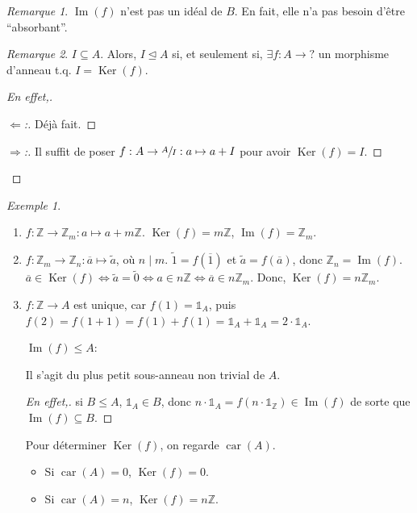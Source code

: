 \documentclass{report}
\theoremstyle{definition}
\theoremstyle{remark}
\newtheorem*{exem}{Exemple}
\newtheorem*{rmq}{Remarque}
\newenvironment*{subproof}[1][D\'emonstration]
{
\begin{proof}[#1]

}
{
\renewcommand{\qedsymbol}{$\blacksquare$}
\end{proof}
\renewcommand{\qedsymbol}{$\square$}
}
\def\lte{\leqslant}
\def\ZZ{\mathbb{Z}}
\def\id{\mathds{1}}
\def\im{\operatorname{Im}}
\def\noyau{\operatorname{Ker}}
\newcommand*{\caract}[1]{\operatorname{car}\left(#1\right)}
\begin{document}
	\begin{rmq}
		$\im(f)$ n'est pas un id\'eal de $B$. En fait, elle n'a pas besoin d'\^etre ``absorbant''.
	\end{rmq}

	\begin{rmq}
		$I\subseteq A$. Alors, $I\trianglelefteq A$ si, et seulement si, $\exists f:A\to?$ un morphisme d'anneau t.q. $I=\noyau(f)$.
		\begin{proof}[En effet,]
			\begin{subproof}[$\Leftarrow$:]
				D\'ej\`a fait.
			\end{subproof}
			\begin{subproof}[$\Rightarrow$:]
				Il suffit de poser $f:A\to\sfrac{A}{I} : a\mapsto a+I$ pour avoir $\noyau(f)=I$.
			\end{subproof}
		\end{proof}
	\end{rmq}

	\begin{exem}
		\begin{enumerate}
			\item $f:\ZZ\to\ZZ_m : a\mapsto a+m\ZZ$. $\noyau(f)=m\ZZ$, $\im(f)=\ZZ_m$.
			\item $f:\ZZ_m\to\ZZ_n : \overline{a}\mapsto\widetilde{a}$, o\`u $n \mid m$. $\widetilde{1}=f(\overline{1})$ et $\widetilde{a}=f(\overline{a})$, donc $\ZZ_n=\im(f)$. $\overline{a}\in\noyau(f) \Longleftrightarrow \widetilde{a}=\widetilde{0} \Longleftrightarrow a\in n\ZZ \Longleftrightarrow \overline{a}\in n\ZZ_m$. Donc, $\noyau(f)=n\ZZ_m$.
			\item $f:\ZZ\to A$ est unique, car $f(1)=\id_A$, puis $f(2)=f(1+1)=f(1)+f(1)=\id_A+\id_A=2\cdot\id_A$.

			$\im(f)\lte A$: \checkmark

			Il s'agit du plus petit sous-anneau non trivial de $A$.
			\begin{proof}[En effet,]
				si $B\lte A$, $\id_A\in B$, donc $n\cdot\id_A=f(n\cdot\id_\ZZ)\in\im(f)$ de sorte que $\im(f)\subseteq B$.
			\end{proof}

			Pour d\'eterminer $\noyau(f)$, on regarde $\caract{A}$.
			\begin{itemize}
				\item Si $\caract{A}=0$, $\noyau(f)=0$.
				\item Si $\caract{A}=n$, $\noyau(f)=n\ZZ$.
			\end{itemize}
		\end{enumerate}
	\end{exem}
\end{document}
